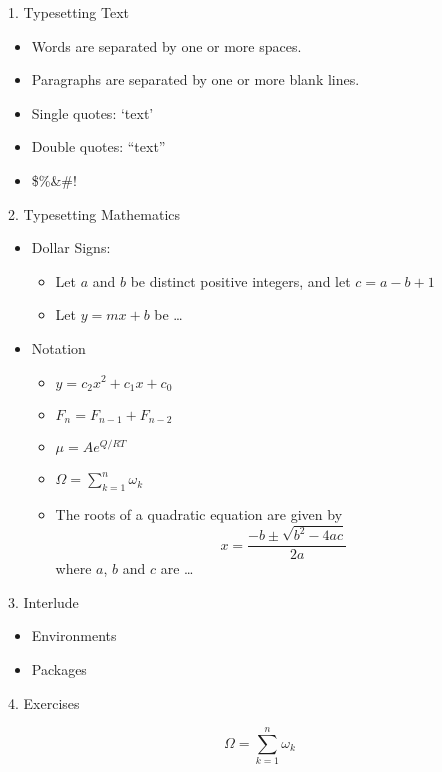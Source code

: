 \documentclass{article}
\begin{document}
1. Typesetting Text
\begin{itemize}
    \item Words are separated by one or more spaces.
    \item Paragraphs are separated by one or more blank lines.
    \item Single quotes: `text'
    \item Double quotes: ``text''
    \item \$\%\&\#!
\end{itemize}

2. Typesetting Mathematics
\begin{itemize}
    \item Dollar Signs: 
    \begin{itemize}
        \item Let $a$ and $b$ be distinct positive integers, and let $c = a - b + 1$
        \item Let $y = mx + b$ be \ldots
    \end{itemize}
    \item Notation
    \begin{itemize}
        \item $y = c_2 x^2 + c_1 x + c_0$
        \item $F_n = F_{n-1} + F_{n-2}$
        \item $\mu = Ae^{Q/RT}$
        \item $\Omega = \sum_{k=1}^{n} \omega_k$
    \end{itemize}
    \begin{itemize}
        \item 
        The roots of a quadratic equation are given by
        \begin{equation}
            x = \frac{-b \pm \sqrt{b^2-4ac}}
                    {2a}
        \end{equation}
        where $a$, $b$ and $c$ are \ldots
    \end{itemize}
\end{itemize}

3. Interlude
\begin{itemize}
    \item Environments
    \item Packages
\end{itemize}

4. Exercises

\begin{equation*}
    \Omega = \sum_{k=1}^{n} \omega_k
\end{equation*}
\end{document}

